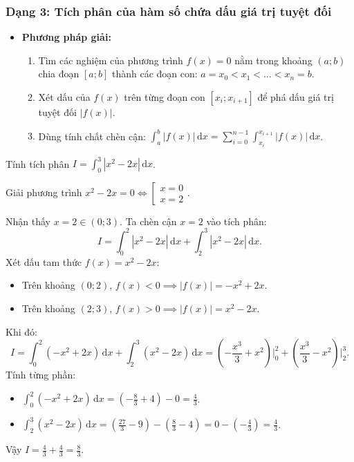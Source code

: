 \documentclass[12pt]{article}
\begin{document}
	\subsubsection{Dạng 3: Tích phân của hàm số chứa dấu giá trị tuyệt đối}
	\begin{itemize}
		\item \textbf{Phương pháp giải:}
		\begin{enumerate}[label=Bước \arabic*:]
			\item Tìm các nghiệm của phương trình $f(x) = 0$ nằm trong khoảng $(a; b)$ chia đoạn $[a; b]$ thành các đoạn con: $a = x_0 < x_1 < \dots < x_n = b$.
			\item Xét dấu của $f(x)$ trên từng đoạn con $[x_i; x_{i+1}]$ để phá dấu giá trị tuyệt đối $|f(x)|$.
			\item Dùng tính chất chèn cận: $\displaystyle \int_a^b |f(x)|\,\mathrm{d}x = \sum_{i=0}^{n-1} \int_{x_i}^{x_{i+1}} |f(x)|\,\mathrm{d}x$.
		\end{enumerate}
	\end{itemize}
	
	\begin{vidu}
		Tính tích phân $I = \displaystyle \int_{0}^{3} |x^2 - 2x|\,\mathrm{d}x$.
	\end{vidu}
	\begin{loigiai}
		Giải phương trình $x^2 - 2x = 0 \iff \left[ \begin{array}{l} x = 0 \\ x = 2 \end{array} \right.$.
		
		Nhận thấy $x = 2 \in (0; 3)$. Ta chèn cận $x = 2$ vào tích phân:
		\[
		I = \int_{0}^{2} |x^2 - 2x|\,\mathrm{d}x + \int_{2}^{3} |x^2 - 2x|\,\mathrm{d}x.
		\]
		Xét dấu tam thức $f(x) = x^2 - 2x$:
		\begin{itemize}
			\item Trên khoảng $(0; 2)$, $f(x) < 0 \implies |f(x)| = -x^2 + 2x$.
			\item Trên khoảng $(2; 3)$, $f(x) > 0 \implies |f(x)| = x^2 - 2x$.
		\end{itemize}
		Khi đó:
		\[
		I = \int_{0}^{2} (-x^2 + 2x)\,\mathrm{d}x + \int_{2}^{3} (x^2 - 2x)\,\mathrm{d}x = \left(-\frac{x^3}{3} + x^2\right) \Bigg|_0^2 + \left(\frac{x^3}{3} - x^2\right) \Bigg|_2^3.
		\]
		Tính từng phần:
		\begin{itemize}
			\item $\displaystyle \int_{0}^{2} (-x^2 + 2x)\,\mathrm{d}x = \left(-\frac{8}{3} + 4\right) - 0 = \frac{4}{3}$.
			\item $\displaystyle \int_{2}^{3} (x^2 - 2x)\,\mathrm{d}x = \left(\frac{27}{3} - 9\right) - \left(\frac{8}{3} - 4\right) = 0 - \left(-\frac{4}{3}\right) = \frac{4}{3}$.
		\end{itemize}
		Vậy $I = \frac{4}{3} + \frac{4}{3} = \frac{8}{3}$.
	\end{loigiai}
\end{document}
